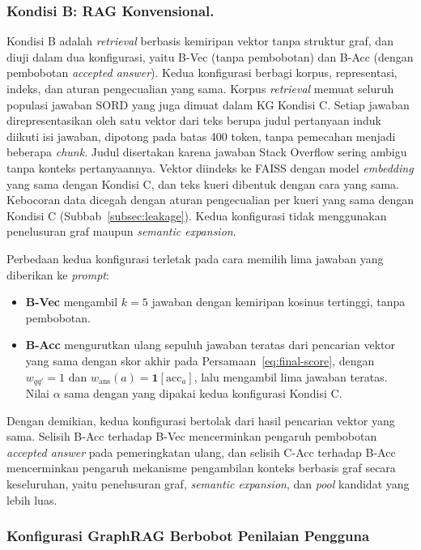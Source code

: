 \subsubsection{Kondisi B: RAG Konvensional.}
Kondisi B adalah \emph{retrieval} berbasis kemiripan vektor tanpa struktur graf, dan diuji dalam dua konfigurasi, yaitu B-Vec (tanpa pembobotan) dan B-Acc (dengan pembobotan \emph{accepted answer}). Kedua konfigurasi berbagi korpus, representasi, indeks, dan aturan pengecualian yang sama. Korpus \emph{retrieval} memuat seluruh populasi jawaban SORD yang juga dimuat dalam KG Kondisi C. Setiap jawaban direpresentasikan oleh satu vektor dari teks berupa judul pertanyaan induk diikuti isi jawaban, dipotong pada batas 400 token, tanpa pemecahan menjadi beberapa \emph{chunk}. Judul disertakan karena jawaban Stack Overflow sering ambigu tanpa konteks pertanyaannya. Vektor diindeks ke FAISS dengan model \emph{embedding} yang sama dengan Kondisi C, dan teks kueri dibentuk dengan cara yang sama. Kebocoran data dicegah dengan aturan pengecualian per kueri yang sama dengan Kondisi C (Subbab~\ref{subsec:leakage}). Kedua konfigurasi tidak menggunakan penelusuran graf maupun \emph{semantic expansion}.

Perbedaan kedua konfigurasi terletak pada cara memilih lima jawaban yang diberikan ke \emph{prompt}:
\begin{itemize}
    \item \textbf{B-Vec} mengambil $k{=}5$ jawaban dengan kemiripan kosinus tertinggi, tanpa pembobotan.
    \item \textbf{B-Acc} mengurutkan ulang sepuluh jawaban teratas dari pencarian vektor yang sama dengan skor akhir pada Persamaan~\eqref{eq:final-score}, dengan $w_{qq'}=1$ dan $w_{\mathrm{ans}}(a)=\mathbf{1}[\mathrm{acc}_a]$, lalu mengambil lima jawaban teratas. Nilai $\alpha$ sama dengan yang dipakai kedua konfigurasi Kondisi C.
\end{itemize}
Dengan demikian, kedua konfigurasi bertolak dari hasil pencarian vektor yang sama. Selisih B-Acc terhadap B-Vec mencerminkan pengaruh pembobotan \emph{accepted answer} pada pemeringkatan ulang, dan selisih C-Acc terhadap B-Acc mencerminkan pengaruh mekanisme pengambilan konteks berbasis graf secara keseluruhan, yaitu penelusuran graf, \emph{semantic expansion}, dan \emph{pool} kandidat yang lebih luas.

\subsubsection{Konfigurasi GraphRAG Berbobot Penilaian Pengguna}
\label{subsec:konfigurasi-graphrag-berbobot}


